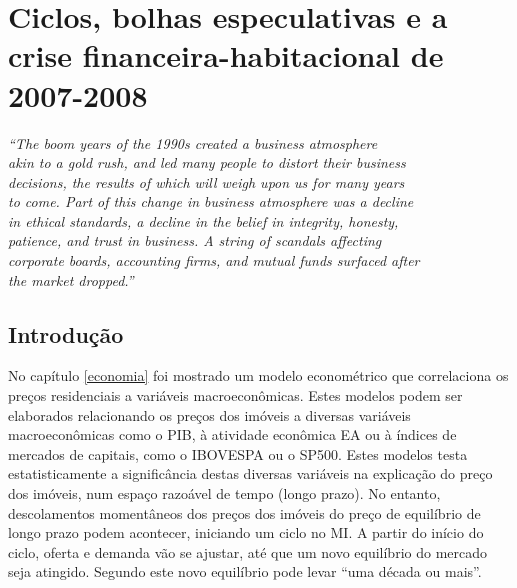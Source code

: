 \documentclass[
	12pt,				%
	oneside,			%
	a4paper,			%
	chapter=TITLE,		%
	section=TITLE,		%
	english,			%
	brazil				%
	]{abntex2}
\begin{document}
\hypertarget{crise2008}{%
\chapter{Ciclos, bolhas especulativas e a crise financeira-habitacional de 2007-2008}\label{crise2008}}
\begin{refsection}
\begin{epigrafe}
    \vspace*{\fill}
    \begin{flushright}
    \textit{``The boom years of the 1990s created a business atmosphere\\
    akin to a gold rush, and led many people to distort their business\\
    decisions, the results of which will weigh upon us for many years\\
    to come. Part of this change in business atmosphere was a decline\\
    in ethical standards, a decline in the belief in integrity, honesty,\\
    patience, and trust in business. A string of scandals affecting\\ 
    corporate boards, accounting firms, and mutual funds surfaced after\\
    the market dropped.''\\
    \cite[p. xiv]{shiller}}
    \end{flushright}
\end{epigrafe}
\hypertarget{introduuxe7uxe3o-4}{%
\section{Introdução}\label{introduuxe7uxe3o-4}}

No capítulo \ref{economia} foi mostrado um modelo econométrico que correlaciona
os preços residenciais a variáveis macroeconômicas. Estes modelos podem ser
elaborados relacionando os preços dos imóveis a diversas variáveis
macroeconômicas como o \gls{PIB}, à atividade econômica \gls{EA} ou à índices de
mercados de capitais, como o \gls{IBOVESPA} ou o \gls{SP500}. Estes modelos
testa estatisticamente a significância destas diversas variáveis na explicação
do preço dos imóveis, num espaço razoável de tempo (longo prazo). No entanto,
descolamentos momentâneos dos preços dos imóveis do preço de equilíbrio de
longo prazo podem acontecer, iniciando um ciclo no \gls{MI}. A partir do início
do ciclo, oferta e demanda vão se ajustar, até que um novo equilíbrio do mercado
seja atingido. Segundo \textcite[p.~18]{regulation} este novo equilíbrio pode levar ``uma
década ou mais''.


\end{refsection}
\end{document}
